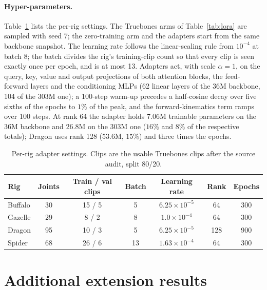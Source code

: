 \paragraph{Hyper-parameters.} Table~\ref{tab:lora_hp} lists the per-rig settings. The Truebones arms of
Table~\ref{tab:lora} are sampled with seed 7; the zero-training arm and the adapters start from the same
backbone snapshot. The learning rate
follows the linear-scaling rule from $10^{-4}$ at batch 8; the batch divides the rig's training-clip
count so that every clip is seen exactly once per epoch, and is at most 13. Adapters
act, with scale $\alpha{=}1$, on the query, key, value and output projections of both attention blocks, the
feed-forward layers and the conditioning MLPs (62 linear layers of the \num{36}M backbone, 104 of the \num{303}M
one); a
100-step warm-up precedes a half-cosine decay over five sixths of the epochs to $1\%$ of the peak, and
the forward-kinematics term ramps over 100 steps. At rank 64 the adapter holds \num{7.06}M trainable
parameters on the \num{36}M backbone and \num{26.8}M on the \num{303}M one ($16\%$ and $8\%$ of the
respective totals); Dragon uses rank 128 (\num{53.6}M, $15\%$) and three times the epochs.

\begin{table}[h]
\centering\small
\caption{Per-rig adapter settings. Clips are the usable Truebones clips after the source audit,
split 80/20.}\label{tab:lora_hp}
\begin{tabular}{lcccccc}
\toprule
Rig & Joints & Train / val clips & Batch & Learning rate & Rank & Epochs \\
\midrule
Buffalo & 30 & 15 / 5 & 5 & $6.25{\times}10^{-5}$ & 64 & 300 \\
Gazelle & 29 & 8 / 2 & 8 & $1.0{\times}10^{-4}$ & 64 & 300 \\
Dragon & 95 & 10 / 3 & 5 & $6.25{\times}10^{-5}$ & 128 & 900 \\
Spider & 68 & 26 / 6 & 13 & $1.63{\times}10^{-4}$ & 64 & 300 \\
\bottomrule
\end{tabular}
\end{table}

\section{Additional extension results}\label{app:extend_more}

